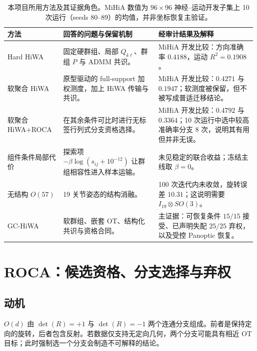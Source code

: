 \documentclass[10pt,a4paper,fontset=windows]{ctexart}
\theoremstyle{definition}
\theoremstyle{remark}
\begin{document}
\begin{table}[H]
\centering\small
\caption{本项目所用方法及其证据角色。MiHiA 数值为 $96\times96$ 神经--运动开发子集上 10 次运行（seeds 80--89）的均值，并非坐标恢复主验证。}
\label{tab:method-lineage}
\begin{tabularx}{0.98\linewidth}{l Y Y}
\toprule
方法 & 回答的问题与保留机制 & 经审计结果及解释\\
\midrule
Hard HiWA & 固定硬群组、局部 $Q_{k\ell}$、群组 $P$ 与 ADMM 共识\cite{lee2019hierarchical}。 & MiHiA 开发比较：方向准确率 $0.4188$，运动 $R^2=0.1908$。\\
软聚合 HiWA & 原型驱动的 full-support 加权测度，加上 HiWA 传输与共识\cite{lee2019hierarchical}。 & MiHiA 开发比较：$0.4271$ 与 $0.1947$；软测度被保留，但不被写成普适迁移结论。\\
软聚合 HiWA+ROCA & 在其余条件可比时进行无标签行列式分支资格选择。 & MiHiA 开发比较：$0.4792$ 与 $0.3364$；10 次运行中选中较高准确率分支 8 次，说明其有用但并非无误。\\
组件条件局部代价 & 探索项 $-\beta\log(s_{ij}+10^{-12})$ 让群组相容性进入样本运输。 & 未见稳定的联合收益；冻结主线取 $\beta=0$。\\
无结构 $O(57)$ & 19 关节姿态的结构消融。 & 100 次迭代内未收敛，旋转误差 $10.31$；这说明需要 $I_{19}\otimes SO(3)$。\\
GC-HiWA & 软群组、嵌套 OT、结构化共识与资格合同。 & 主证据：可恢复条件 $15/15$ 接受、已声明失配 $25/25$ 弃权，以及受控 Panoptic 恢复。\\
\bottomrule
\end{tabularx}
\end{table}

\section{ROCA：候选资格、分支选择与弃权}
\label{sec:roca}

\subsection{动机}
$O(d)$ 由 $\det(R)=+1$ 与 $\det(R)=-1$ 两个连通分支组成。前者是保持定向的旋转，后者包含反射。若数据仅支持无定向几何，两个分支可能具有相近 OT 目标；此时强制选一个分支会制造不可解释的结论。
\end{document}
